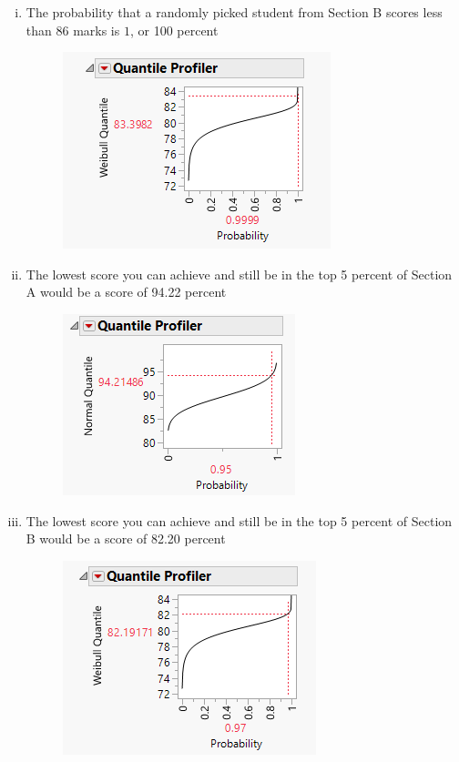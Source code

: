 \documentclass[14pt]{article}
\begin{document}
\begin{enumerate}[(i)]
\pagebreak

\item
The probability that a randomly picked student from Section B scores less than 86 marks is $1$, or 100 percent 

\begin{figure}[h]
\centering
\includegraphics{exam2/1vi.png}
\end{figure}

\item
The lowest score you can achieve and still be in the top 5 percent of Section A would be a score of 94.22 percent 

\begin{figure}[h]
\centering
\includegraphics{exam2/1vii.png}
\end{figure}

\item
The lowest score you can achieve and still be in the top 5 percent of Section B would be a score of 82.20 percent 

\begin{figure}[h]
\centering
\includegraphics{exam2/1viii.png}
\end{figure}

\end{enumerate}
\end{document}
